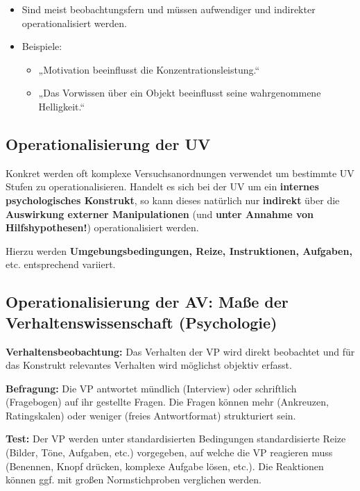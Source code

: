 \documentclass[
]{book}
\providecommand{\tightlist}{%
  \setlength{\itemsep}{0pt}\setlength{\parskip}{0pt}}
\begin{document}
\begin{itemize}
\tightlist
\item
  Sind meist beobachtungsfern und müssen aufwendiger und indirekter operationalisiert werden.
\item
  Beispiele:

  \begin{itemize}
  \tightlist
  \item
    „Motivation beeinflusst die Konzentrationsleistung.``
  \item
    „Das Vorwissen über ein Objekt beeinflusst seine wahrgenommene Helligkeit.``
  \end{itemize}
\end{itemize}

\hypertarget{operationalisierung-der-uv-1}{%
\subsection{Operationalisierung der UV}\label{operationalisierung-der-uv-1}}

Konkret werden oft komplexe Versuchsanordnungen verwendet um bestimmte UV Stufen zu
operationalisieren. Handelt es sich bei der UV um ein \textbf{internes psychologisches Konstrukt}, so kann
dieses natürlich nur \textbf{indirekt} über die \textbf{Auswirkung externer Manipulationen} (und \textbf{unter Annahme
von Hilfshypothesen!}) operationalisiert werden.

Hierzu werden \textbf{Umgebungsbedingungen, Reize, Instruktionen, Aufgaben,} etc. entsprechend variiert.

\hypertarget{operationalisierung-der-av-mauxdfe-der-verhaltenswissenschaft-psychologie}{%
\subsection{Operationalisierung der AV: Maße der Verhaltenswissenschaft (Psychologie)}\label{operationalisierung-der-av-mauxdfe-der-verhaltenswissenschaft-psychologie}}

\textbf{Verhaltensbeobachtung:} Das Verhalten der VP wird direkt beobachtet und für das Konstrukt
relevantes Verhalten wird möglichst objektiv erfasst.

\textbf{Befragung:} Die VP antwortet mündlich (Interview) oder schriftlich (Fragebogen) auf ihr gestellte
Fragen. Die Fragen können mehr (Ankreuzen, Ratingskalen) oder weniger (freies Antwortformat)
strukturiert sein.

\textbf{Test:} Der VP werden unter standardisierten Bedingungen standardisierte Reize (Bilder, Töne,
Aufgaben, etc.) vorgegeben, auf welche die VP reagieren muss (Benennen, Knopf drücken, komplexe
Aufgabe lösen, etc.). Die Reaktionen können ggf. mit großen Normstichproben verglichen werden.
\end{document}
